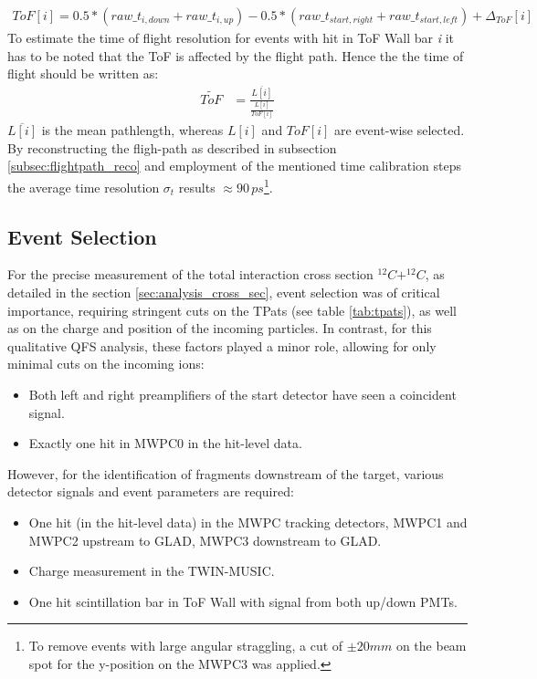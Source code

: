 \begin{align*}
ToF[i] = 0.5*(raw\_t_{i,down}+raw\_t_{i,up}) - 0.5*(raw\_t_{start,right}+raw\_t_{start,left}) + \Delta_{ToF}[i]
\end{align*}  
To estimate the time of flight resolution for events with hit in ToF Wall bar \textit{i} it has to be noted that the ToF is affected by the flight path. Hence the the time of flight should be written as:
\begin{align*}
\widetilde{ToF} &= \frac{\overline{L[i]}}{\frac{L[i]}{ToF[i]}}
\end{align*}
$\overline{L[i]}$ is the mean pathlength, whereas $L[i]$ and $ToF[i]$ are event-wise selected.
By reconstructing the fligh-path as described in subsection \ref{subsec:flightpath_reco} and employment of the mentioned time calibration steps the average time resolution $\sigma_t$ results $\approx 90\, ps$\footnote{To remove events with large angular straggling, a cut of $\pm 20mm$ on the beam spot for the y-position on the MWPC3 was applied.}.

\subsection{Event Selection}
For the precise measurement of the total interaction cross section $^{12}C + ^{12}C$, as detailed in the section \ref{sec:analysis_cross_sec}, event selection was of critical importance, requiring stringent cuts on the TPats (see table \ref{tab:tpats}), as well as on the charge and position of the incoming particles. In contrast, for this qualitative QFS analysis, these factors played a minor role, allowing for only minimal cuts on the incoming ions:
\begin{itemize}
\item Both left and right preamplifiers of the start detector have seen a coincident signal.
\item Exactly one hit in MWPC0 in the hit-level data.
\end{itemize}
However, for the identification of fragments downstream of the target, various detector signals and event parameters are required:
\begin{itemize} 
\item One hit (in the hit-level data) in the MWPC tracking detectors, MWPC1 and MWPC2 upstream to GLAD, MWPC3 downstream to GLAD.
\item Charge measurement in the TWIN-MUSIC.
\item One hit scintillation bar in ToF Wall with signal from both up/down PMTs.
\end{itemize}
